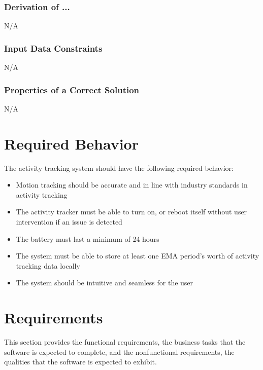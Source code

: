 \documentclass[12pt]{article}
\begin{document}
\subsubsection*{Derivation of ...}
N/A

\subsubsection{Input Data Constraints} \label{sec_DataConstraints}
N/A


\subsubsection{Properties of a Correct Solution} \label{sec_CorrectSolution}
N/A


\section{Required Behavior}
\label{Req_Behavior}
The activity tracking system should have the following required behavior: \\

\begin{itemize}
\item Motion tracking should be accurate and in line with industry standards in activity tracking\\
\item The activity tracker must be able to turn on, or reboot itself without user intervention if an issue is detected\\
\item The battery must last a minimum of 24 hours\\
\item The system must be able to store at least one EMA period's worth of activity tracking data locally\\
\item The system should be intuitive and seamless for the user\\
\end{itemize} 

\section{Requirements}
\label{Requirements}
This section provides the functional requirements, the business tasks that the
software is expected to complete, and the nonfunctional requirements, the
qualities that the software is expected to exhibit.
\end{document}
